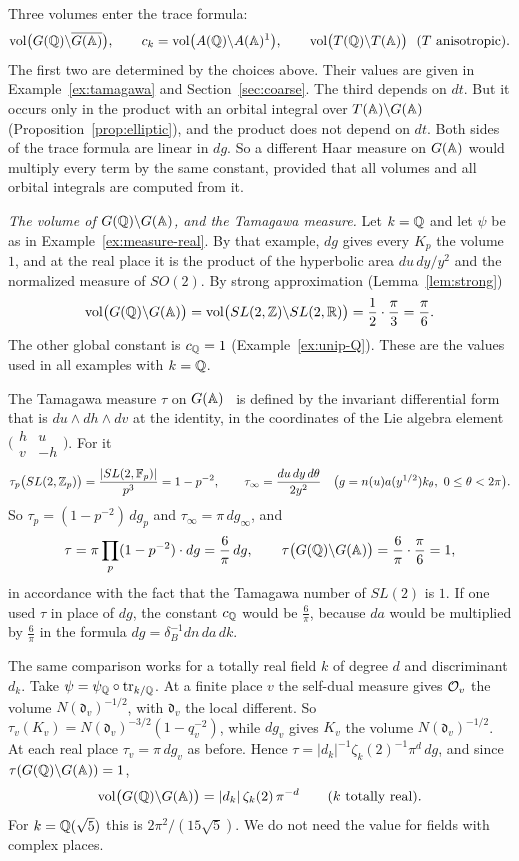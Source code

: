Three volumes enter the trace formula:
\[
\vol\bigl(G(\Q)\backslash\overline{G(\A)}\bigr),\qquad
c_k=\vol\bigl(A(\Q)\backslash A(\A)^1\bigr),\qquad
\vol\bigl(T(\Q)\backslash T(\A)\bigr)\ \ (T\ \text{anisotropic}).
\]
The first two are determined by the choices above. Their values are
given in Example~\ref{ex:tamagawa} and Section~\ref{sec:coarse}. The
third depends on $dt$. But it occurs only in the product with an orbital
integral over $T(\mathbb{A})\backslash G(\mathbb{A})$ (Proposition~\ref{prop:elliptic}),
and the product does not depend on $dt$. Both sides of the trace formula
are linear in $dg$. So a different Haar measure on $G(\mathbb{A})$ would multiply
every term by the same constant, provided that all volumes and all
orbital integrals are computed from it.

\begin{example}\label{ex:tamagawa}
\emph{The volume of $G(\mathbb{Q})\backslash G(\mathbb{A})$, and the Tamagawa measure.}
Let $k=\mathbb{Q}$ and let $\psi$ be as in Example~\ref{ex:measure-real}. By that
example, $dg$ gives every $K_p$ the volume $1$, and at the real place it
is the product of the hyperbolic area $du\,dy/y^2$ and the normalized
measure of $SO(2)$. By strong approximation (Lemma~\ref{lem:strong})
\[
\operatorname{vol}\bigl(G(\mathbb{Q})\backslash G(\mathbb{A})\bigr)=\operatorname{vol}\bigl(SL(2,\mathbb{Z})\backslash
SL(2,\mathbb{R})\bigr)=\frac12\cdot\frac\pi3=\frac\pi6 .
\]
The other global constant is $c_{\mathbb{Q}}=1$ (Example~\ref{ex:unip-Q}). These
are the values used in all examples with $k=\mathbb{Q}$.

The Tamagawa measure $\tau$ on $G(\mathbb{A})$~\cite{We82} is defined by the
invariant differential form that is $du\wedge dh\wedge dv$ at the
identity, in the coordinates of the Lie algebra element
$\bigl(\begin{smallmatrix}h&u\\v&-h\end{smallmatrix}\bigr)$. For it
\[
\tau_p\bigl(SL(2,\mathbb{Z}_p)\bigr)=\frac{|SL(2,\mathbb F_p)|}{p^3}=1-p^{-2},
\qquad \tau_\infty=\frac{du\,dy\,d\theta}{2y^2}\quad\bigl(g=n(u)a(y^{1/2})
k_\theta,\ 0\le\theta<2\pi\bigr).
\]
So $\tau_p=(1-p^{-2})\,dg_p$ and $\tau_\infty=\pi\,dg_\infty$, and
\[
\tau=\pi\prod_p(1-p^{-2})\cdot dg=\frac6\pi\,dg,\qquad
\tau\bigl(G(\mathbb{Q})\backslash G(\mathbb{A})\bigr)=\frac6\pi\cdot\frac\pi6=1 ,
\]
in accordance with the fact that the Tamagawa number of $SL(2)$ is
$1$. If one used $\tau$ in place of $dg$, the constant $c_{\mathbb{Q}}$ would
be $\frac6\pi$, because $da$ would be multiplied by $\frac6\pi$ in the
formula $dg=\delta_B^{-1}dn\,da\,dk$.

The same comparison works for a totally real field $k$ of degree $d$ and
discriminant $d_k$. Take $\psi=\psi_{\mathbb{Q}}\circ\operatorname{tr}_{k/\mathbb{Q}}$. At
a finite place $v$ the self-dual measure gives $\mathcal{O}_v$ the volume
$N(\mathfrak d_v)^{-1/2}$, with $\mathfrak d_v$ the local different. So
$\tau_v(K_v)=N(\mathfrak d_v)^{-3/2}(1-q_v^{-2})$, while $dg_v$ gives
$K_v$ the volume $N(\mathfrak d_v)^{-1/2}$. At each real place
$\tau_v=\pi\,dg_v$ as before. Hence $\tau=|d_k|^{-1}\zeta_k(2)^{-1}\pi^d
\,dg$, and since $\tau(G(\mathbb{Q})\backslash G(\mathbb{A}))=1$,
\[
\operatorname{vol}\bigl(G(\mathbb{Q})\backslash G(\mathbb{A})\bigr)=|d_k|\,\zeta_k(2)\,\pi^{-d}
\qquad(k\ \text{totally real}).
\]
For $k=\mathbb{Q}(\sqrt5)$ this is $2\pi^2/(15\sqrt5)$. We do not need the value
for fields with complex places.
\end{example}

